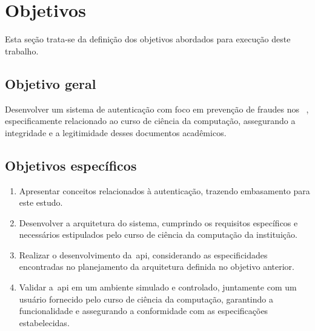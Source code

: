 \section{Objetivos}\label{sec:objetivos}

Esta seção trata-se da definição dos objetivos abordados para
execução deste trabalho.
\subsection{Objetivo geral}\label{subsec:objetivo-geral}

Desenvolver um sistema de autenticação com foco em prevenção de fraudes nos
~, especificamente relacionado ao curso de ciência da computação,
assegurando a integridade e a legitimidade desses documentos acadêmicos.
\subsection{Objetivos específicos}\label{subsec:objetivos-especificos}

\newcommand{\buscaReferencia}{
    Apresentar conceitos relacionados à autenticação, trazendo embasamento
    para este estudo.
}

\newcommand{\arquitetura}{
    Desenvolver a arquitetura do sistema, cumprindo os requisitos
    específicos e necessários estipulados pelo curso de ciência da
    computação da instituição.
}

\newcommand{\implementacao}{
    Realizar o desenvolvimento da~\acrshort{api}, considerando as
    especificidades encontradas no planejamento da arquitetura definida no
    objetivo anterior.
}

\newcommand{\testes}{
    Validar a~\acrshort{api} em um ambiente simulado e controlado, juntamente
    com um usuário fornecido pelo curso de ciência da computação, garantindo
    a funcionalidade e assegurando a conformidade com as especificações
    estabelecidas.
}

\begin{enumerate}[label=\alph*)]
    \item  \buscaReferencia
    \item  \arquitetura
    \item  \implementacao
    \item  \testes
\end{enumerate}